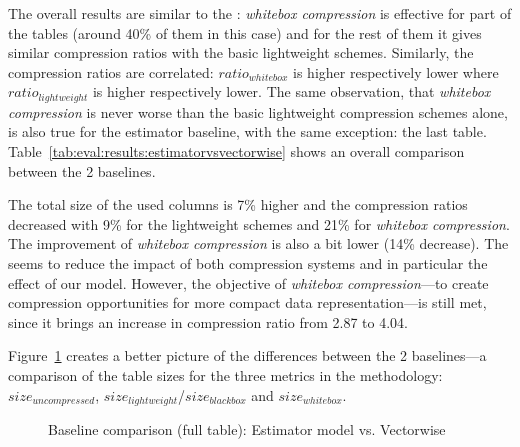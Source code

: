 The overall results are similar to the : \textit{whitebox compression} is effective for part of the tables (around 40\% of them in this case) and for the rest of them it gives similar compression ratios with the basic lightweight schemes. Similarly, the compression ratios are correlated: \(ratio_{whitebox}\) is higher respectively lower where \(ratio_{lightweight}\) is higher respectively lower. The same observation, that \textit{whitebox compression} is never worse than the basic lightweight compression schemes alone, is also true for the estimator baseline, with the same exception: the last table. Table~\ref{tab:eval:results:estimatorvsvectorwise} shows an overall comparison between the 2 baselines.



The total size of the used columns is 7\% higher and the compression ratios decreased with 9\% for the lightweight schemes and 21\% for \textit{whitebox compression}. The improvement of \textit{whitebox compression} is also a bit lower (14\% decrease). The  seems to reduce the impact of both compression systems and in particular the effect of our model. However, the objective of \textit{whitebox compression}---to create compression opportunities for more compact data representation---is still met, since it brings an increase in compression ratio from 2.87 to 4.04.

Figure~\ref{fig:eval:results:estimatorvsvw} creates a better picture of the differences between the 2 baselines---a comparison of the table sizes for the three metrics in the methodology: \(size_{uncompressed}\), \(size_{lightweight}\)/\(size_{blackbox}\) and \(size_{whitebox}\).

\begin{figure}[h]
  \centering
  \caption{Baseline comparison (full table): Estimator model vs. Vectorwise}
  \label{fig:eval:results:estimatorvsvw}
\end{figure}

